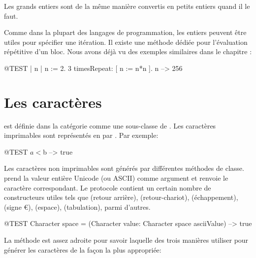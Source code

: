 \documentclass[a4paper,10pt,twoside]{book}
\begin{document}
Les grands entiers sont de la m\^eme mani\`ere convertis en petits entiers quand il le faut.

Comme dans la plupart des langages de programmation, les entiers peuvent \^etre utiles pour sp\'ecifier une it\'eration.  Il existe une m\'ethode d\'edi\'ee  pour l'\'evaluation r\'ep\'etitive d'un bloc.
Nous avons d\'ej\`a vu des exemples similaires dans le chapitre :
\begin{code}{@TEST | n |}
n := 2.
3 timesRepeat: [ n := n*n ].
n --> 256
\end{code}

\section{Les caract\`eres}

 est d\'efinie dans la cat\'egorie  comme une sous-classe de . Les caract\`eres imprimables sont repr\'esent\'es en \squeak par .  Par exemple:

\begin{code}{@TEST}
$a < $b --> true
\end{code}

Les caract\`eres non imprimables sont g\'en\'er\'es par diff\'erentes
m\'ethodes de classe. \mbox{} prend la
valeur enti\`ere Unicode (ou ASCII) comme argument et renvoie le
caract\`ere correspondant. Le protocole  contient un certain nombre de constructeurs utiles tels
que  
(retour arri\`ere), 
(retour-chariot),
(\'echappement),
(signe \euro),
(espace), 
(tabulation), 
parmi d'autres.

\begin{code}{@TEST}
Character space = (Character value: Character space asciiValue) --> true
\end{code}

La m\'ethode  est assez adroite pour
savoir laquelle des trois mani\`eres utiliser pour g\'en\'erer les
caract\`eres de la fa\c{c}on la plus appropri\'ee:
\end{document}
